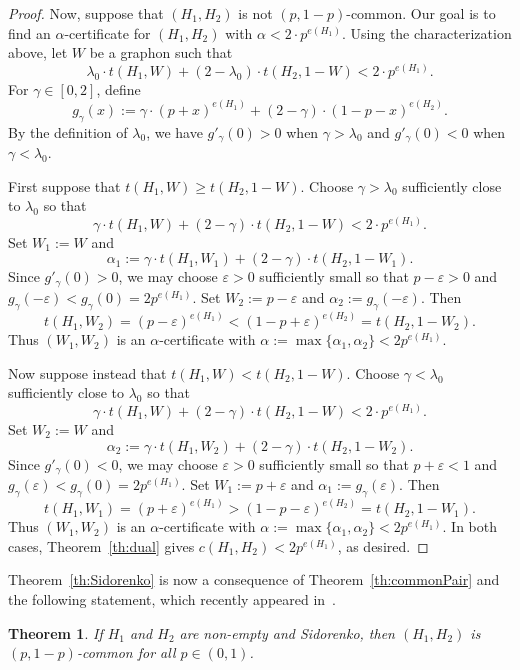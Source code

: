 \documentclass[12pt]{article}
\numberwithin{equation}{section}
\newtheorem{thm}[equation]{Theorem}
\theoremstyle{definition}
\theoremstyle{remark}
\begin{document}
\begin{proof}
Now, suppose that $(H_1,H_2)$ is not $(p,1-p)$-common. Our goal is to find an $\alpha$-certificate for $(H_1,H_2)$ with $\alpha<2\cdot p^{e(H_1)}$. Using the characterization above, let $W$ be a graphon such that
\[
\lambda_0\cdot t(H_1,W)+(2-\lambda_0)\cdot t(H_2,1-W)<2\cdot p^{e(H_1)}.
\]
For $\gamma\in[0,2]$, define
\[
g_\gamma(x):=\gamma\cdot (p+x)^{e(H_1)}+(2-\gamma)\cdot(1-p-x)^{e(H_2)}.
\]
By the definition of $\lambda_0$, we have $g'_\gamma(0)>0$ when $\gamma>\lambda_0$ and $g'_\gamma(0)<0$ when $\gamma<\lambda_0$.

First suppose that $t(H_1,W)\geq t(H_2,1-W)$. Choose $\gamma>\lambda_0$ sufficiently close to $\lambda_0$ so that
\[
\gamma\cdot t(H_1,W)+(2-\gamma)\cdot t(H_2,1-W)<2\cdot p^{e(H_1)}.
\]
Set $W_1:=W$ and
\[
\alpha_1:=\gamma\cdot t(H_1,W_1)+(2-\gamma)\cdot t(H_2,1-W_1).
\]
Since $g'_\gamma(0)>0$, we may choose $\varepsilon>0$ sufficiently small so that $p-\varepsilon>0$ and $
g_\gamma(-\varepsilon)<g_\gamma(0)=2p^{e(H_1)}$. Set $W_2:=p-\varepsilon$ and $\alpha_2:=g_\gamma(-\varepsilon)$. Then
\[
t(H_1,W_2)=(p-\varepsilon)^{e(H_1)}<(1-p+\varepsilon)^{e(H_2)}=t(H_2,1-W_2).
\]
Thus $(W_1,W_2)$ is an $\alpha$-certificate with $\alpha:=\max\{\alpha_1,\alpha_2\}<2p^{e(H_1)}$. 

Now suppose instead that $t(H_1,W)<t(H_2,1-W)$. Choose $\gamma<\lambda_0$ sufficiently close to $\lambda_0$ so that
\[
\gamma\cdot t(H_1,W)+(2-\gamma)\cdot t(H_2,1-W)<2\cdot p^{e(H_1)}.
\]
Set $W_2:=W$ and
\[
\alpha_2:=\gamma\cdot t(H_1,W_2)+(2-\gamma)\cdot t(H_2,1-W_2).
\]
Since $g'_\gamma(0)<0$, we may choose $\varepsilon>0$ sufficiently small so that $p+\varepsilon<1$ and $g_\gamma(\varepsilon)<g_\gamma(0)=2p^{e(H_1)}$. Set $W_1:=p+\varepsilon$ and $\alpha_1:=g_\gamma(\varepsilon)$. Then
\[
t(H_1,W_1)=(p+\varepsilon)^{e(H_1)}>(1-p-\varepsilon)^{e(H_2)}=t(H_2,1-W_1).
\]
Thus $(W_1,W_2)$ is an $\alpha$-certificate with $\alpha:=\max\{\alpha_1,\alpha_2\}<2p^{e(H_1)}$. In both cases, Theorem~\ref{th:dual} gives $c(H_1,H_2)<2p^{e(H_1)}$, as desired.
\end{proof}

Theorem~\ref{th:Sidorenko} is now a consequence of Theorem~\ref{th:commonPair} and the following statement, which recently appeared in~\cite{BehagueMorrisonNoel25}. 

\begin{thm}
\label{th:SidCommon}
If $H_1$ and $H_2$ are non-empty and Sidorenko, then $(H_1,H_2)$ is $(p,1-p)$-common for all $p\in (0,1)$. 
\end{thm}
\end{document}
